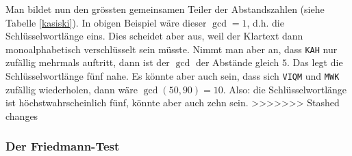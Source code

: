 \documentclass[%
<<<<<<< Updated upstream
11pt,%
twoside,%
titlepage,%
german,%
headsepline%
]{scrartcl}
\begin{document}
\begin{bsp}
Man bildet nun den grössten gemeinsamen Teiler der Abstandszahlen (siehe Tabelle \ref{kasiski}). In obigen Beispiel wäre dieser $\gcd = 1$, d.h. die Schlüsselwortlänge eins. Dies scheidet aber aus, weil der Klartext dann monoalphabetisch verschlüsselt sein müsste. Nimmt man aber an, dass \texttt{KAH} nur zufällig mehrmals auftritt, dann ist der $\gcd$ der Abstände gleich $5$. Das legt die Schlüsselwortlänge fünf nahe. Es könnte aber auch sein, dass sich \texttt{VIQM} und \texttt{MWK} zufällig wiederholen, dann wäre $\gcd(50, 90) = 10$. Also: die Schlüsselwortlänge ist höchstwahrscheinlich fünf, könnte aber auch zehn sein.
>>>>>>> Stashed changes
\end{bsp}

\subsubsection{Der Friedmann-Test}
\end{document}
